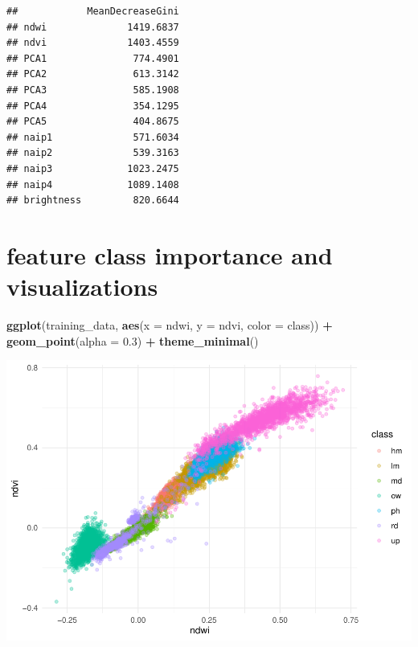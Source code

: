 \documentclass[
]{article}
\newenvironment{Shaded}{\begin{snugshade}}{\end{snugshade}}
\newcommand{\AttributeTok}[1]{\textcolor[rgb]{0.13,0.29,0.53}{#1}}
\newcommand{\CommentTok}[1]{\textcolor[rgb]{0.56,0.35,0.01}{\textit{#1}}}
\newcommand{\FloatTok}[1]{\textcolor[rgb]{0.00,0.00,0.81}{#1}}
\newcommand{\FunctionTok}[1]{\textcolor[rgb]{0.13,0.29,0.53}{\textbf{#1}}}
\newcommand{\NormalTok}[1]{#1}
\newcommand{\SpecialCharTok}[1]{\textcolor[rgb]{0.81,0.36,0.00}{\textbf{#1}}}
\begin{document}
\begin{Shaded}
\end{Shaded}

\begin{verbatim}
##            MeanDecreaseGini
## ndwi              1419.6837
## ndvi              1403.4559
## PCA1               774.4901
## PCA2               613.3142
## PCA3               585.1908
## PCA4               354.1295
## PCA5               404.8675
## naip1              571.6034
## naip2              539.3163
## naip3             1023.2475
## naip4             1089.1408
## brightness         820.6644
\end{verbatim}

\section{feature class importance and
visualizations}\label{feature-class-importance-and-visualizations}

\begin{Shaded}
\begin{Highlighting}[]
\FunctionTok{ggplot}\NormalTok{(training\_data, }\FunctionTok{aes}\NormalTok{(}\AttributeTok{x =}\NormalTok{ ndwi, }\AttributeTok{y =}\NormalTok{ ndvi, }\AttributeTok{color =}\NormalTok{ class)) }\SpecialCharTok{+}
  \FunctionTok{geom\_point}\NormalTok{(}\AttributeTok{alpha =} \FloatTok{0.3}\NormalTok{) }\SpecialCharTok{+}
  \FunctionTok{theme\_minimal}\NormalTok{()}
\end{Highlighting}
\end{Shaded}

\includegraphics{veg_model_files/figure-latex/unnamed-chunk-5-1.pdf}
\end{document}
